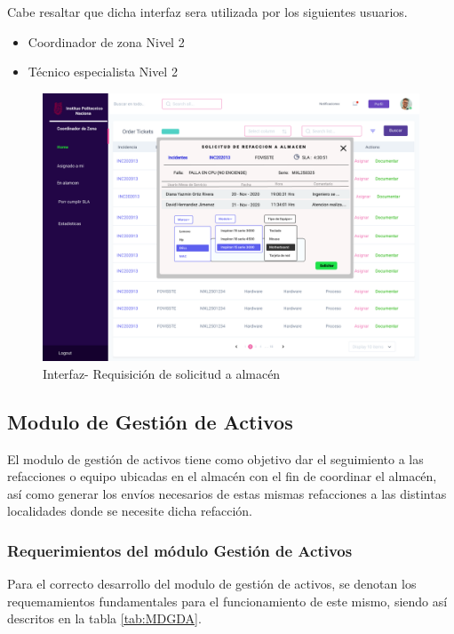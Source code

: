 Cabe resaltar que dicha interfaz sera utilizada por los siguientes usuarios. 



\begin{itemize}
	\item Coordinador de zona Nivel 2
	\item Técnico especialista Nivel 2 
\end{itemize}
	\begin{figure}[H]
	\centering
	\includegraphics[width=1.1\textwidth]{Capitulo4/Img/GestionInc/Asi-almacen-sol}
	\caption{Interfaz- Requisición de solicitud a almacén}
	\label{fig:RQSALINF}
\end{figure}







\newpage
\subsection{Modulo de Gestión de Activos}
El modulo de gestión de activos tiene como objetivo dar el seguimiento a las refacciones o equipo ubicadas en el almacén con el fin de coordinar el almacén, así como generar los envíos necesarios de estas mismas refacciones a las distintas localidades donde se necesite dicha refacción.
\subsubsection{Requerimientos del módulo Gestión de Activos}
Para el correcto desarrollo del modulo de gestión de activos, se denotan los  requemamientos fundamentales para el funcionamiento de este mismo, siendo así descritos en la tabla \ref{tab:MDGDA}.

